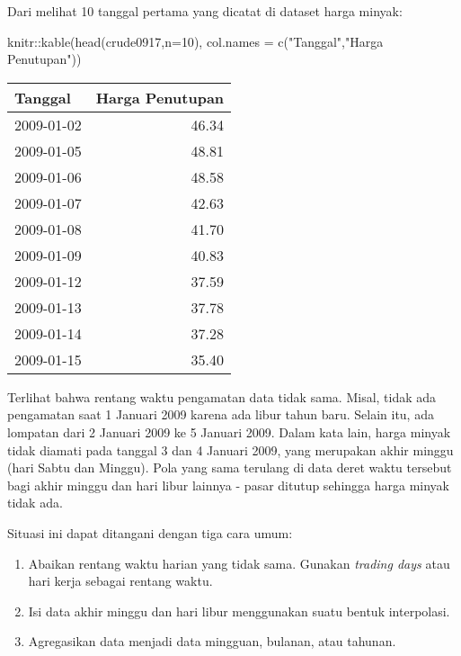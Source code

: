 \documentclass[
]{book}
\newenvironment{Shaded}{\begin{snugshade}}{\end{snugshade}}
\newcommand{\AttributeTok}[1]{\textcolor[rgb]{0.77,0.63,0.00}{#1}}
\newcommand{\DecValTok}[1]{\textcolor[rgb]{0.00,0.00,0.81}{#1}}
\newcommand{\FunctionTok}[1]{\textcolor[rgb]{0.00,0.00,0.00}{#1}}
\newcommand{\NormalTok}[1]{#1}
\newcommand{\SpecialCharTok}[1]{\textcolor[rgb]{0.00,0.00,0.00}{#1}}
\newcommand{\StringTok}[1]{\textcolor[rgb]{0.31,0.60,0.02}{#1}}
\providecommand{\tightlist}{%
  \setlength{\itemsep}{0pt}\setlength{\parskip}{0pt}}
\begin{document}
Dari melihat 10 tanggal pertama yang dicatat di dataset harga minyak:

\begin{Shaded}
\begin{Highlighting}[]
\NormalTok{knitr}\SpecialCharTok{::}\FunctionTok{kable}\NormalTok{(}\FunctionTok{head}\NormalTok{(crude0917,}\AttributeTok{n=}\DecValTok{10}\NormalTok{),}
             \AttributeTok{col.names =} \FunctionTok{c}\NormalTok{(}\StringTok{"Tanggal"}\NormalTok{,}\StringTok{"Harga Penutupan"}\NormalTok{))}
\end{Highlighting}
\end{Shaded}

\begin{tabular}{l|r}
\hline
Tanggal & Harga Penutupan\\
\hline
2009-01-02 & 46.34\\
\hline
2009-01-05 & 48.81\\
\hline
2009-01-06 & 48.58\\
\hline
2009-01-07 & 42.63\\
\hline
2009-01-08 & 41.70\\
\hline
2009-01-09 & 40.83\\
\hline
2009-01-12 & 37.59\\
\hline
2009-01-13 & 37.78\\
\hline
2009-01-14 & 37.28\\
\hline
2009-01-15 & 35.40\\
\hline
\end{tabular}

Terlihat bahwa rentang waktu pengamatan data tidak sama. Misal, tidak ada pengamatan saat 1 Januari 2009 karena ada libur tahun baru. Selain itu, ada lompatan dari 2 Januari 2009 ke 5 Januari 2009. Dalam kata lain, harga minyak tidak diamati pada tanggal 3 dan 4 Januari 2009, yang merupakan akhir minggu (hari Sabtu dan Minggu). Pola yang sama terulang di data deret waktu tersebut bagi akhir minggu dan hari libur lainnya - pasar ditutup sehingga harga minyak tidak ada.

Situasi ini dapat ditangani dengan tiga cara umum:

\begin{enumerate}
\def\labelenumi{\arabic{enumi}.}
\tightlist
\item
  Abaikan rentang waktu harian yang tidak sama. Gunakan \emph{trading days} atau hari kerja sebagai rentang waktu.
\item
  Isi data akhir minggu dan hari libur menggunakan suatu bentuk interpolasi.
\item
  Agregasikan data menjadi data mingguan, bulanan, atau tahunan.
\end{enumerate}
\end{document}
